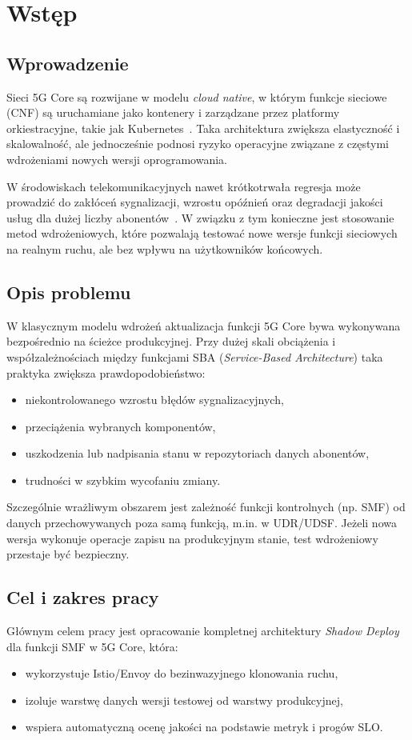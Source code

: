 \chapter{Wstęp}
\section{Wprowadzenie}
Sieci 5G Core są rozwijane w modelu \emph{cloud native}, w którym funkcje sieciowe (CNF) są uruchamiane jako kontenery i zarządzane przez platformy orkiestracyjne, takie jak Kubernetes~\cite{3gpp23_501,kubernetesDocs}. Taka architektura zwiększa elastyczność i skalowalność, ale jednocześnie podnosi ryzyko operacyjne związane z częstymi wdrożeniami nowych wersji oprogramowania.

W środowiskach telekomunikacyjnych nawet krótkotrwała regresja może prowadzić do zakłóceń sygnalizacji, wzrostu opóźnień oraz degradacji jakości usług dla dużej liczby abonentów~\cite{3gpp23_502}. W związku z tym konieczne jest stosowanie metod wdrożeniowych, które pozwalają testować nowe wersje funkcji sieciowych na realnym ruchu, ale bez wpływu na użytkowników końcowych.

\section{Opis problemu}
W klasycznym modelu wdrożeń aktualizacja funkcji 5G Core bywa wykonywana bezpośrednio na ścieżce produkcyjnej. Przy dużej skali obciążenia i współzależnościach między funkcjami SBA (\emph{Service-Based Architecture}) taka praktyka zwiększa prawdopodobieństwo:
\begin{itemize}
    \item niekontrolowanego wzrostu błędów sygnalizacyjnych,
    \item przeciążenia wybranych komponentów,
    \item uszkodzenia lub nadpisania stanu w repozytoriach danych abonentów,
    \item trudności w szybkim wycofaniu zmiany.
\end{itemize}

Szczególnie wrażliwym obszarem jest zależność funkcji kontrolnych (np. SMF) od danych przechowywanych poza samą funkcją, m.in. w UDR/UDSF. Jeżeli nowa wersja wykonuje operacje zapisu na produkcyjnym stanie, test wdrożeniowy przestaje być bezpieczny.

\section{Cel i zakres pracy}
Głównym celem pracy jest opracowanie kompletnej architektury \emph{Shadow Deploy} dla funkcji SMF w 5G Core, która:
\begin{itemize}
    \item wykorzystuje Istio/Envoy do bezinwazyjnego klonowania ruchu,
    \item izoluje warstwę danych wersji testowej od warstwy produkcyjnej,
    \item wspiera automatyczną ocenę jakości na podstawie metryk i progów SLO.
\end{itemize}

